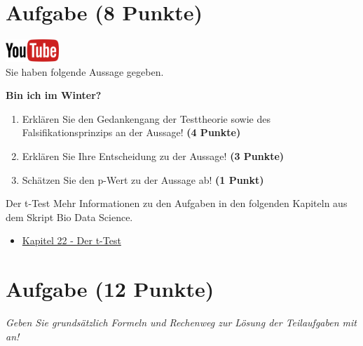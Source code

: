 \documentclass[a4paper, 10pt]{scrartcl}\usepackage[]{graphicx}\usepackage[]{xcolor}
\begin{document}
\clearpage

\section{Aufgabe \hfill (8 Punkte)}

\hfill\href{https://youtu.be/gQwvMuZ-Sjs}{\includegraphics[width =
  2cm]{img/youtube}}\\[1Ex]



Sie haben folgende Aussage gegeben.

\begin{center}
  \Large\textbf{Bin ich im Winter?}
\end{center}

\begin{enumerate}
\item Erkl{\"a}ren Sie den Gedankengang der Testtheorie sowie des Falsifikationsprinzips an der Aussage! \textbf{(4 Punkte)}
\item Erkl{\"a}ren Sie Ihre Entscheidung zu der Aussage! \textbf{(3 Punkte)}
\item Sch{\"a}tzen Sie den p-Wert zu der Aussage ab! \textbf{(1 Punkt)}
\end{enumerate}

 
\clearpage
\begin{graybox}{Der t-Test}
Mehr Informationen zu den Aufgaben in den folgenden Kapiteln aus dem Skript Bio Data Science.
  \begin{itemize}
  \item \href{https://jkruppa.github.io/stat-tests-ttest.html}{Kapitel 22 - Der t-Test}
  \end{itemize}
\end{graybox}
\clearpage

\section{Aufgabe \hfill (12 Punkte)}

\textit{Geben Sie grunds{\"a}tzlich Formeln und Rechenweg zur L{\"o}sung der
  Teilaufgaben mit an!} \\[1Ex]
\end{document}
